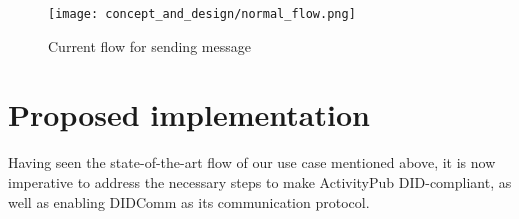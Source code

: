 \begin{figure}[H]
  \centering
  \texttt{[image: concept\_and\_design/normal\_flow.png]}
  \caption{Current flow for sending message}
  \label{fig:normal_flow}
\end{figure}

\pagebreak

\section{Proposed implementation}\label{section:did_flow}
Having seen the state-of-the-art flow of our use case mentioned above, it is now imperative to address the necessary steps to make ActivityPub DID-compliant, as well as enabling DIDComm as its communication protocol. 

